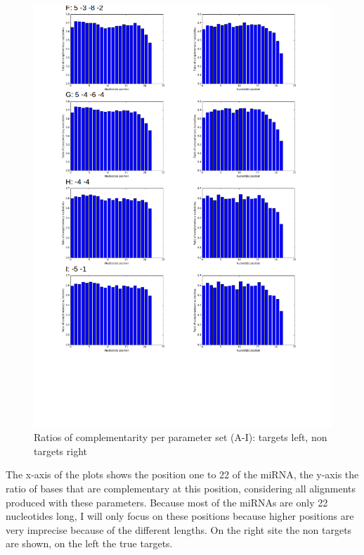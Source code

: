 \documentclass[12pt]{article}
\begin{document}
\begin{figure}
\includegraphics[scale=0.65]{results/compl2.png}
\vspace{-3cm}
\caption{Ratios of complementarity per parameter set (A-I): targets left, non targets right}
\label{ratios}
\end{figure}

The x-axis of the plots shows the position one to 22 of the miRNA, the y-axis the ratio of bases that are complementary at this position, considering all alignments produced with these parameters. Because most of the miRNAs are only 22 nucleotides long, I will only focus on these positions because higher positions are very imprecise because of the different lengths. On the right site the non targets are shown, on the left the true targets.
\end{document}
